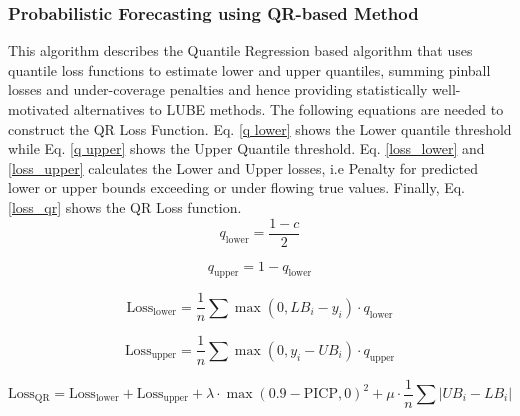 \begin{itemize}
    \subsubsection{Probabilistic Forecasting using QR-based Method}
    This algorithm describes the Quantile Regression based algorithm that uses quantile loss functions to estimate lower and upper quantiles, summing pinball losses and under-coverage penalties and hence providing statistically well-motivated alternatives to LUBE methods. The following equations are needed to construct the QR Loss Function. Eq. \eqref{q lower} shows the Lower quantile threshold while Eq. \eqref{q upper} shows the Upper Quantile threshold. Eq. \eqref{loss_lower} and \eqref{loss_upper} calculates the Lower and Upper losses, i.e Penalty for predicted lower or upper bounds exceeding or under flowing true values. Finally, Eq. \eqref{loss_qr} shows the QR Loss function. \\

    \begin{equation}
        q_{\text{lower}} = \frac{1 - c}{2}
        \label{q lower}
    \end{equation}

    \begin{equation}
        q_{\text{upper}} = 1 - q_{\text{lower}}
        \label{q upper}
    \end{equation}

    \begin{equation}
    \text{Loss}_{\text{lower}} = \frac{1}{n} \sum \max(0, LB_i - y_i) \cdot q_{\text{lower}}
    \label{loss_lower}
    \end{equation}
    
    \begin{equation}
    \text{Loss}_{\text{upper}} = \frac{1}{n} \sum \max(0, y_i - UB_i) \cdot q_{\text{upper}}
    \label{loss_upper}
    \end{equation}

    \begin{equation}
    \text{Loss}_{\text{QR}} = \text{Loss}_{\text{lower}} + \text{Loss}_{\text{upper}} + \lambda \cdot \max(0.9 - \text{PICP}, 0)^2 + \mu \cdot \frac{1}{n} \sum |UB_i - LB_i|
    \label{loss_qr}
    \end{equation}


\end{itemize}
